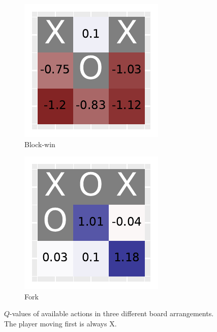 \documentclass[10pt]{IEEEtran}
\begin{document}
\begin{figure}[h]
\begin{subfigure}[t]{0.32\linewidth}
         \includegraphics[width=\linewidth]{code/figures/deep_heatmap_1.pdf}
         \caption{Block-win}
         \label{fig_deep_heatmap_2}
     \end{subfigure}
     \hfill
     \begin{subfigure}[t]{0.32\linewidth}
         \centering
         \includegraphics[width=\linewidth]{code/figures/deep_heatmap_2.pdf}
         \caption{Fork}
         \label{fig_deep_heatmap_3}
     \end{subfigure}
        \caption{$Q$-values of available actions in three different board arrangements. The player moving first is always X.}
        \label{plot_question9}
\end{figure}
\end{document}
